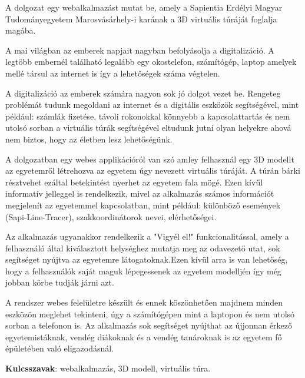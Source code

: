 A dolgozat egy webalkalmazást mutat be, amely a Sapientia Erdélyi Magyar Tudományegyetem Marosvásárhely-i karának a 3D virtuális túráját foglalja magába. 

A mai világban az emberek napjait nagyban befolyásolja a digitalizáció. A legtöbb embernél található legalább egy okostelefon, számítógép, laptop amelyek mellé társul az internet is így a lehetőségek száma végtelen.

A digitalizáció az emberek számára nagyon sok jó dolgot vezet be. Rengeteg problémát tudunk megoldani az internet és a digitális eszközök segítségével, mint például: számlák fizetése, távoli rokonokkal könnyebb a kapcsolattartás és nem utolsó sorban a virtuális túrák segítségével eltudunk jutni olyan helyekre ahová nem biztos, hogy az életben lesz lehetőségünk.

A dolgozatban egy webes applikációról van szó amley felhasznál egy 3D modellt az egyetemről létrehozva az egyetem úgy nevezett virtuális túráját. A túrán bárki résztvehet ezáltal betekintést nyerhet az egyetem fala mögé. Ezen kívűl informatív jelleggel is rendelkezik, mivel az alkalmazás számos információt megjelenít az egyetemmel kapcsolatban, mint például: különböző események (Sapi-Line-Tracer), szakkoordinátorok nevei, elérhetőségei.

Az alkalmazás ugyanakkor rendelkezik a "Vigyél el!" funkcionalitással, amely a felhasználó által kiválasztott helységhez mutatja meg az odavezető utat, sok segítséget nyújtva az egyetemre látogatoknak.Ezen kívül arra is van lehetőség, hogy a felhasználók saját maguk lépegessenek az egyetem modelljén így még jobban körbe tudják járni azt.

A rendszer webes felelületre készült és ennek köszönhetően majdnem minden eszközön meglehet tekinteni, úgy a számítógépen mint a laptopon és nem utolsó sorban a telefonon is. Az alkalmazás sok segítséget nyújthat az újjonnan érkező egyetemistáknak, vendég diákoknak és a vendég tanároknak is az egyetem fő épületében való eligazodásnál. 

\textbf{Kulcsszavak}: webalkalmazás, 3D modell, virtuális túra.